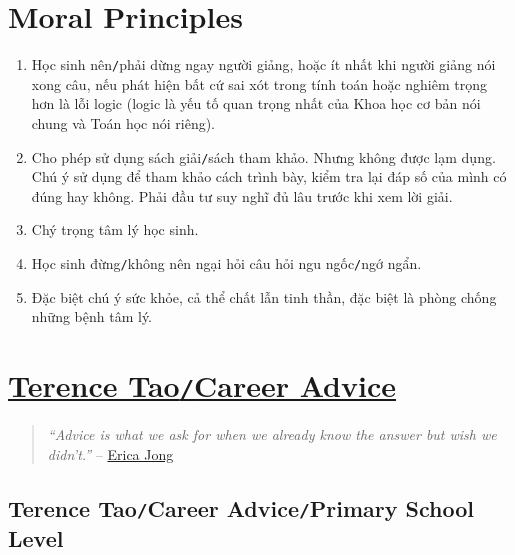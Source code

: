 \documentclass{article}
\numberwithin{equation}{section}
\begin{document}

\section{Moral Principles}

\begin{enumerate}
	\item Học sinh nên\texttt{/}phải dừng ngay người giảng, hoặc ít nhất khi người giảng nói xong câu, nếu phát hiện bất cứ sai xót trong tính toán hoặc nghiêm trọng hơn là lỗi logic (logic là yếu tố quan trọng nhất của Khoa học cơ bản nói chung và Toán học nói riêng).
	\item Cho phép sử dụng sách giải\texttt{/}sách tham khảo. Nhưng không được lạm dụng. Chú ý sử dụng để tham khảo cách trình bày, kiểm tra lại đáp số của mình có đúng hay không. Phải đầu tư suy nghĩ đủ lâu trước khi xem lời giải.
	\item Chý trọng tâm lý học sinh.
	\item Học sinh đừng\texttt{/}không nên ngại hỏi câu hỏi ngu ngốc\texttt{/}ngớ ngẩn.
	\item Đặc biệt chú ý sức khỏe, cả thể chất lẫn tinh thần, đặc biệt là phòng chống những bệnh tâm lý.
\end{enumerate}


\section{\href{https://terrytao.wordpress.com/career-advice/}{Terence Tao\texttt{/}Career Advice}}
\begin{quotation}
	\textit{``Advice is what we ask for when we already know the answer but wish we didn't.''} -- \href{http://en.wikipedia.org/wiki/Erica_Jong}{Erica Jong}
\end{quotation}

\subsection{Terence Tao\texttt{/}Career Advice\texttt{/}Primary School Level}
\end{document}
